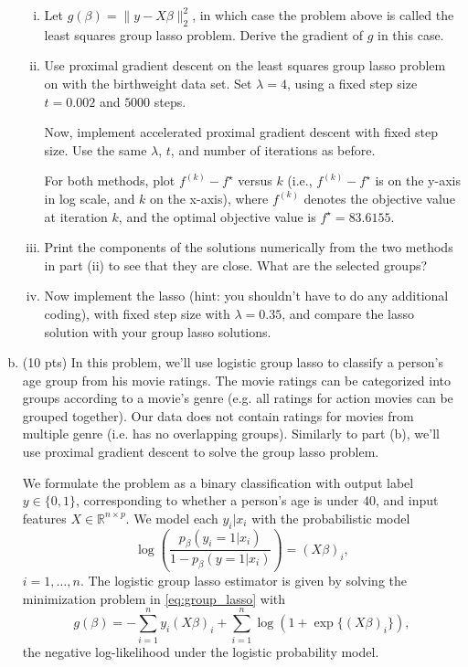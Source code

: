 \documentclass{article}
\theoremstyle{remark}
\theoremstyle{definition}
\begin{document}
\begin{enumerate}[(a)]
  \begin{enumerate}[(i)]

  \item Let $g(\beta)=\|y-X\beta\|_2^2$, in which case the problem 
    above is called the least squares group lasso problem.  Derive the
    gradient of $g$ in this case.

  \item Use proximal gradient descent on the least squares group lasso
    problem on with the birthweight data set. Set $\lambda=4$, using 
    a fixed step size $t=0.002$ and $5000$ steps. 

    Now, implement accelerated proximal gradient descent with fixed step
    size. Use the same $\lambda$, $t$, and number of iterations as before.


    For both methods, plot $f^{(k)}-f^\star$ versus $k$ (i.e., 
    $f^{(k)}-f^\star$ is on the y-axis in log scale, and $k$ on the x-axis), where 
    $f^{(k)}$ denotes the objective value at iteration $k$, and the
    optimal objective value is $f^\star = 83.6155$. 

  \item Print the components of the solutions numerically from the two methods
    in part (ii) to see that they are close. What are the selected groups?

  \item Now implement the lasso (hint: you shouldn't have to do any
    additional coding), with fixed step size with $\lambda = 0.35$,
    and compare the lasso solution with your group lasso solutions.
  \end{enumerate}

\item (10 pts) In this problem, we'll use logistic group lasso to classify a
  person's age group from his movie ratings. The movie ratings can be
  categorized into groups according to a movie's genre (e.g. all ratings for
  action movies can be grouped together). Our data does not contain ratings for
  movies from multiple genre (i.e. has no overlapping groups). Similarly to part
  (b), we'll use proximal gradient descent to solve the group lasso problem.

  We formulate the problem as a binary classification with output label
  $y \in \{0,1\}$, corresponding to whether a person's age is under $40$, and
  input features $X \in \mathbb{R}^{n \times p}$. We model each $y_i|x_i$
  with the probabilistic model
  \[
    \log\left(\frac{p_{\beta}(y_i = 1|x_i)}{1-p_{\beta}(y =
        1|x_i)}\right) = (X\beta)_i,
  \]
  $i=1,\ldots,n$.
  The logistic group lasso estimator is given by solving the
  minimization problem in \eqref{eq:group_lasso} with
  \[
    g(\beta) = -\sum_{i=1}^{n}y_i(X\beta)_i + \sum_{i=1}^{n}\log(1 +
    \exp\{(X\beta)_i\}),
  \]
  the negative log-likelihood under the logistic probability model.  


\end{enumerate}
\end{document}
